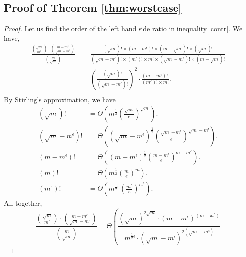 \documentclass[11pt]{article}
\theoremstyle{plain}
\theoremstyle{definition}
\numberwithin{equation}{section}%
\numberwithin{equation}{section}%
\begin{document}
\begin{appendix}
\section{Proof of Theorem \ref{thm:worstcase}}\label{apx-proofs:worstcase}

\begin{proof}

Let us find the order of the left hand side ratio in inequality \eqref{contr}. We have,
\begin{align*}
\frac{\binom{\sqrt{m}}{m^{\epsilon}} \cdot \binom{m-m^{\epsilon}}{\sqrt{m}-m^{\epsilon}} }{\binom{m}{\sqrt{m}}}&=
\frac{  (\sqrt{m})!    \times  (m-{m^{\epsilon}})! \times (m-\sqrt{m})!  \times   (\sqrt{m})!   }{ (    \sqrt{m} -   m^{\epsilon} )!\times (      m^{\epsilon} )! \times    m! \times (    \sqrt{m} -   m^{\epsilon} )! \times(m-\sqrt{m})!    } \\
&= \left(\frac{  (\sqrt{m})!   }{ (    \sqrt{m} -   m^{\epsilon} )! } \right)^2 \cdot \frac{     (m-{m^{\epsilon}})! \  }{ (      m^{\epsilon} )! \times    m!   } .\\
\end{align*}
By Stirling's approximation, we have
\begin{align*}
 \left(\sqrt{m}\right)! &= \Theta \left(   m^{\frac{1}{4}}  \left(\frac{\sqrt{m}}{e}   \right)^{\sqrt{m}}                \right). \\
 \left(\sqrt{m}-m^{\epsilon}\right)! &= \Theta \left(  ( \sqrt{m}-m^{\epsilon})^{\frac{1}{2}}  \left(\frac{\sqrt{m}-m^{\epsilon}}{e}   \right)^{\sqrt{m}-m^{\epsilon}}                \right). \\
 \left(m-m^{\epsilon}\right)! &= \Theta \left(  ( m-m^{\epsilon})^{\frac{1}{2}}  \left(\frac{m-m^{\epsilon}}{e}   \right)^{m-m^{\epsilon}}                \right). \\
\left(m\right)! &= \Theta \left(   m^{\frac{1}{2}}  \left(\frac{m}{e}   \right)^{m}                \right) .\\
\left(m^{\epsilon}\right)! &= \Theta \left(   m^{\frac{1}{2} \epsilon }\left(\frac{m^{\epsilon}}{e}   \right)^{m^{\epsilon}}                \right) .
\end{align*}
All together,
$$\frac{\binom{\sqrt{m}}{m^{\epsilon}} \cdot \binom{m-m^{\epsilon}}{\sqrt{m}-m^{\epsilon}} }{\binom{m}{\sqrt{m}}}= \Theta \left( \frac {   \left( \sqrt{m} \right)^{2 \sqrt{m}} \cdot  \left( m-m^{\epsilon}    \right)^{ \left(m-m^{\epsilon}\right)}  }{  m^{\frac{1}{2} \epsilon }  \cdot
\left( \sqrt{m}-m^{\epsilon}    \right)^{2 \left(\sqrt{m}-m^{\epsilon}\right)}
}$$
\end{proof}
\end{appendix}
\end{document}
